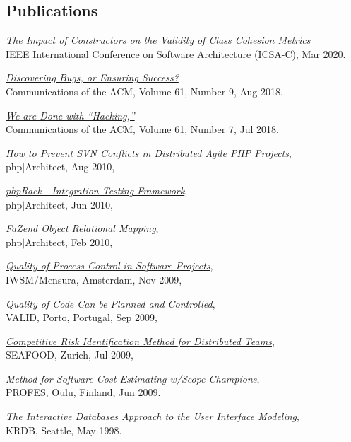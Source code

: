 \documentclass[12pt]{article}
\begin{document}
\subsection*{Publications}

\emph{\href{https://www.yegor256.com/pdf/2020/icsa20.pdf}{The Impact of Constructors on the Validity of Class Cohesion Metrics}}\\
IEEE International Conference on Software Architecture (ICSA-C), Mar 2020.

\emph{\href{https://www.yegor256.com/pdf/2018/discovering-bugs.pdf}{Discovering Bugs, or Ensuring Success?}}\\
Communications of the ACM, Volume 61, Number 9, Aug 2018.

\emph{\href{https://www.yegor256.com/pdf/2018/we-are-done-with-hacking.pdf}{We are Done with ``Hacking,''}}\\
Communications of the ACM, Volume 61, Number 7, Jul 2018.

\emph{\href{https://www.yegor256.com/pdf/2010/phpArchitect-conflicts.pdf}{How to Prevent SVN Conflicts in Distributed Agile PHP Projects}},\\
php$|$Architect, Aug 2010,

\emph{\href{https://www.yegor256.com/pdf/2010/phpArchitect-phpRack.pdf}{phpRack---Integration Testing Framework}},\\
php$|$Architect, Jun 2010,

\emph{\href{https://www.yegor256.com/pdf/2010/phpArchitect-fazend-orm.pdf}{FaZend Object Relational Mapping}},\\
php$|$Architect, Feb 2010,

\emph{\href{https://www.yegor256.com/pdf/2009/IWSM09-article.pdf}{Quality of Process Control in Software Projects}},\\
IWSM/Mensura, Amsterdam, Nov 2009,

\emph{Quality of Code Can be Planned and Controlled},\\
VALID, Porto, Portugal, Sep 2009,

\emph{\href{https://www.yegor256.com/pdf/2009/SEAFOOD09-article.pdf}{Competitive Risk Identification Method for Distributed Teams}},\\
SEAFOOD, Zurich, Jul 2009,

\emph{Method for Software Cost Estimating w/Scope Champions},\\
PROFES, Oulu, Finland, Jun 2009.

\emph{\href{https://www.yegor256.com/pdf/1998/KRDB98-article.pdf}{The Interactive Databases Approach to the User Interface Modeling}},\\
KRDB, Seattle, May 1998.
\end{document}
